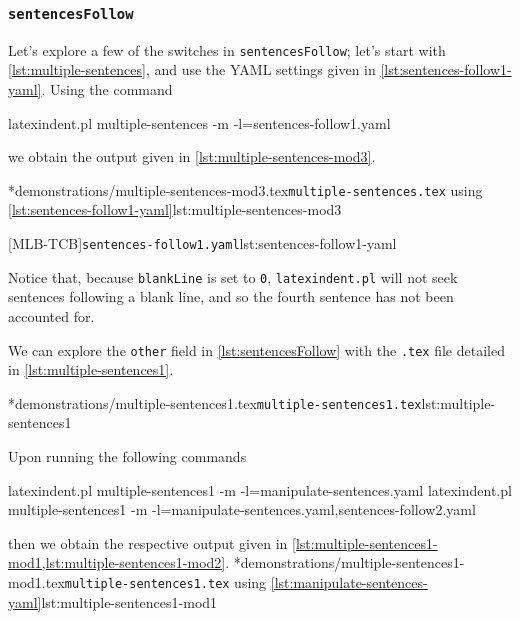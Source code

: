 \subsubsection{\texttt{sentencesFollow}}
	Let's explore a few of the switches in \texttt{sentencesFollow}; let's start with \vref{lst:multiple-sentences}, and use the YAML
	settings given in \cref{lst:sentences-follow1-yaml}. Using the command
	\begin{commandshell}
latexindent.pl multiple-sentences -m -l=sentences-follow1.yaml
\end{commandshell}
	we obtain the output given in \cref{lst:multiple-sentences-mod3}.

	\begin{minipage}{.5\linewidth}
		\cmhlistingsfromfile*[showspaces=false]*{demonstrations/multiple-sentences-mod3.tex}{\texttt{multiple-sentences.tex} using \cref{lst:sentences-follow1-yaml}}{lst:multiple-sentences-mod3}
	\end{minipage}
	\hfill
	\begin{minipage}{.5\linewidth}
		[MLB-TCB]{\texttt{sentences-follow1.yaml}}{lst:sentences-follow1-yaml}
	\end{minipage}

	Notice that, because \texttt{blankLine} is set to \texttt{0}, \texttt{latexindent.pl} will not seek sentences following a blank line,
	and so the fourth sentence has not been accounted for.

	We can explore the \texttt{other} field in \cref{lst:sentencesFollow} with the \texttt{.tex} file detailed in \cref{lst:multiple-sentences1}.

	\cmhlistingsfromfile*[showspaces=false]*{demonstrations/multiple-sentences1.tex}{\texttt{multiple-sentences1.tex}}{lst:multiple-sentences1}

	Upon running the following commands
	\begin{widepage}
		\begin{commandshell}
latexindent.pl multiple-sentences1 -m -l=manipulate-sentences.yaml
latexindent.pl multiple-sentences1 -m -l=manipulate-sentences.yaml,sentences-follow2.yaml
	\end{commandshell}
	\end{widepage}
	then we obtain the respective output given in \cref{lst:multiple-sentences1-mod1,lst:multiple-sentences1-mod2}.
	\cmhlistingsfromfile*[showspaces=false]*{demonstrations/multiple-sentences1-mod1.tex}{\texttt{multiple-sentences1.tex} using \vref{lst:manipulate-sentences-yaml}}{lst:multiple-sentences1-mod1}

